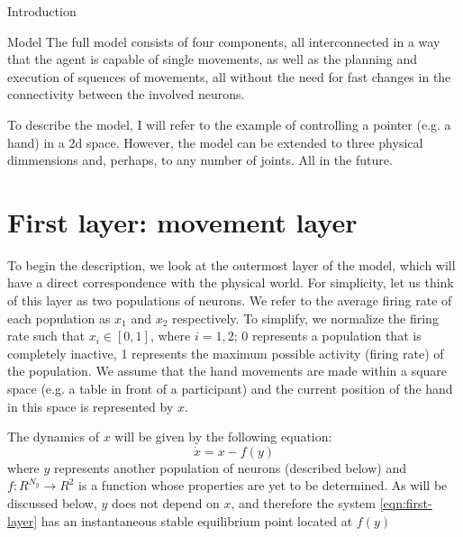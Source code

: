 \documentclass{report}
\begin{document}
\begin{chapter}{Introduction}

\end{chapter}

\begin{chapter}{Model}
The full model consists of four components, all interconnected in a way that the agent is capable of single movements, as well as the planning and execution of squences of movements, all without the need for fast changes in the connectivity between the involved neurons.

To describe the model, I will refer to the example of controlling a pointer (e.g. a hand) in a 2d space. However, the model can be extended to three physical dimmensions and, perhaps, to any number of joints. All in the future.

\section{First layer: movement layer}
To begin the description, we look at the outermost layer of the model, which will have a direct correspondence with the physical world. For simplicity, let us think of this layer as two populations of neurons. We refer to the average firing rate of each population as $x_1$ and $x_2$ respectively. To simplify, we normalize the firing rate such that $x_i \in [0, 1]$, where $i = {1, 2}$; 0 represents a population that is completely inactive, 1 represents the maximum possible activity (firing rate) of the population. We assume that the hand movements are made within a square space (e.g. a table in front of a participant) and the current position of the hand in this space is represented by $x$.

The dynamics of $x$ will be given by the following equation:
\begin{equation}
\dot x = x - f(y) \label{eqn:first-layer}
\end{equation}
where $y$ represents another population of neurons (described below) and $f:R^{N_y}\rightarrow R^2$ is a function whose properties are yet to be determined. As will be discussed below, $y$ does not depend on $x$, and therefore the system \ref{eqn:first-layer} has an instantaneous stable equilibrium point located at $f(y)$


\end{chapter}
\end{document}
